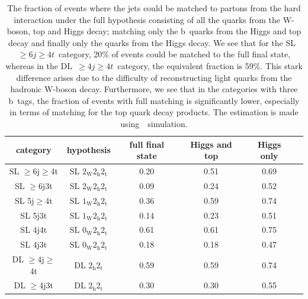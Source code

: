 \begin{table}[h!]
\begin{center}
\begin{tabular}{c|ccccc}
\hline
category & hypothesis & full final state & Higgs and top & Higgs only \\
\hline
SL $\geq$6j$\geq$4t & SL $2_{\mathrm{W}} 2_{\mathrm{h}} 2_{\mathrm{t}}$ & 0.20 & 0.51 & 0.69 \\
SL $\geq$6j3t & SL $2_{\mathrm{W}} 2_{\mathrm{h}} 2_{\mathrm{t}}$ & 0.09 & 0.24 & 0.52 \\
SL 5j$\geq$4t & SL $1_{\mathrm{W}} 2_{\mathrm{h}} 2_{\mathrm{t}}$ & 0.36 & 0.59 & 0.74 \\
SL 5j3t & SL $1_{\mathrm{W}} 2_{\mathrm{h}} 2_{\mathrm{t}}$  & 0.14 & 0.23 & 0.51 \\
SL 4j4t & SL $0_{\mathrm{W}} 2_{\mathrm{h}} 2_{\mathrm{t}}$ & 0.61 & 0.61 & 0.75 \\
SL 4j3t & SL $0_{\mathrm{W}} 2_{\mathrm{h}} 2_{\mathrm{t}}$  & 0.18 & 0.18 & 0.47 \\
\hline
DL $\geq$4j$\geq$4t & DL $2_{\mathrm{h}} 2_{\mathrm{t}}$ & 0.59 & 0.59 & 0.74 \\
DL $\geq$4j3t & DL $2_{\mathrm{h}} 2_{\mathrm{t}}$ & 0.30 & 0.30 & 0.55 \\
\hline
\hline
\end{tabular}
\caption[The fraction of matched events in the analysis categories]{The fraction of events where the jets could be matched to partons from the hard interaction under the full hypothesis consisting of all the quarks from the W-boson, top and Higgs decay; matching only the b~quarks from the Higgs and top decay and finally only the quarks from the Higgs decay. We see that for the SL~$\geq6j\geq4t$~category, 20\% of events could be matched to the full final state, whereas in the DL~$\geq4j\geq4t$~category, the equivalent fraction is 59\%. This stark difference arises due to the difficulty of reconstructing light quarks from the hadronic W-boson decay. Furthermore, we see that in the categories with three b~tags, the fraction of events with full matching is significantly lower, especially in terms of matching for the top quark decay products. The estimation is made using~\ttHbb~simulation.}
\end{center}
\label{tab:matching_fracs}
\end{table}


